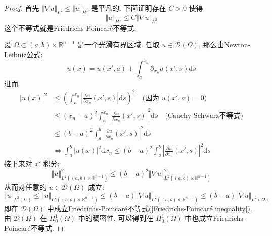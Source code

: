 \documentclass[11pt]{ctexart}[UTF8]
\begin{document}
\begin{proof}
    首先 $\Vert \nabla u \Vert_{L^2} \leq \Vert u \Vert_{H^{1}}$ 是平凡的. 下面证明存在 $C > 0$ 使得 
    \begin{equation}\label{Friedrichs-Poincaré inequality}
        \Vert u \Vert_{H^{1}} \leq C\Vert \nabla u \Vert_{L^2}
    \end{equation}
    这个不等式就是Friedrichs-Poincaré不等式.\par
    设 $\Omega \subset (a,b)\times \mathbb{R}^{n-1}$ 是一个光滑有界区域. 任取 $u \in \mathscr{D}(\Omega)$, 那么由Newton-Leibniz公式:
    \begin{equation*}
        u(x) = u(x',a)+\int_{a}^{x_n} \partial_{x_n}u(x', s) \mathrm{d}s
    \end{equation*}
    进而
    \begin{equation*}
        \begin{aligned}
            |u(x)|^{2} &\leq \left( \int_{a}^{x_{n}}\left| \frac{\partial u}{\partial x_{n}}(x', s) \right| \mathrm{d}s \right)^2\quad \text{(因为 $u(x', a) = 0$)}\\
            &\leq (x_{n}-a)^2 \int_{a}^{x_{n}} \left|\frac{\partial u}{\partial x_{n}}(x', s) \right|^2 \mathrm{d}s \quad \text{(Cauchy-Schwarz不等式)}\\
            &\leq (b-a)^2 \int_{a}^{b} \left|\frac{\partial u}{\partial x_{n}}(x', s) \right|^2 \mathrm{d}s\\
            & \Longrightarrow \int_{a}^{b} |u(x)|^2 \mathrm{d}x_n \leq (b-a)^2 \int_{a}^{b} \left|\frac{\partial u}{\partial x_{n}}(x', s) \right|^2 \mathrm{d}s
        \end{aligned}
    \end{equation*}
    接下来对 $x'$ 积分:
    \begin{equation*}
        \Vert u \Vert_{L^2((a,b)\times \mathbb{R}^{n-1})}^2 \leq (b-a)^2 \Vert \nabla u \Vert_{L^2((a,b)\times \mathbb{R}^{n-1})}^2
    \end{equation*}
    从而对任意的 $u \in \mathscr{D}(\Omega)$ 成立:
    \begin{equation*}
        \Vert u \Vert_{L^2(\Omega)} \leq \Vert u \Vert_{L^2((a,b)\times \mathbb{R}^{n-1})} \leq (b-a) \Vert \nabla u \Vert_{L^2((a,b)\times \mathbb{R}^{n-1})} \leq (b-a) \Vert \nabla u \Vert_{L^2(\Omega)}
    \end{equation*}
    即在 $\mathscr{D}(\Omega)$ 中成立Friedrichs-Poincaré不等式(\ref{Friedrichs-Poincaré inequality}). 由 $\mathscr{D}(\Omega)$ 在 $H_{0}^{1}(\Omega)$ 中的稠密性, 可以得到在 $H_{0}^{1}(\Omega)$ 中也成立Friedrichs-Poincaré不等式.
\end{proof}
\end{document}

